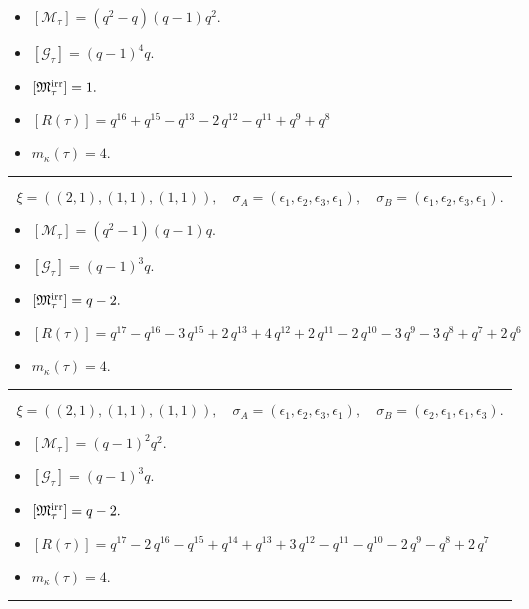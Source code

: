 \documentclass[10pt,a4paper]{amsart}
\begin{document}
\begin{itemize}
 \item $[\mathcal{M}_{\tau}] = {\left(q^{2} - q\right)} {\left(q - 1\right)} q^{2} .$

 \item $[\mathcal{G}_{\tau}] = {\left(q - 1\right)}^{4} q .$

 \item $[{\frak M}_{\tau}^{\textrm{irr}}] = 1 .$

 \item $[R(\tau)] = q^{16} + q^{15} - q^{13} - 2 \, q^{12} - q^{11} + q^{9} + q^{8} $

 \item $m_{\kappa}(\tau) = 4 .$

 \end{itemize}
\noindent\rule{8cm}{0.4pt}

$$\xi = ({(2, 1)}, {(1, 1)}, {(1, 1)}),\quad \sigma_A = ({{\epsilon_1, \epsilon_2}}, {{\epsilon_3}}, {{\epsilon_1}}),\quad \sigma_B = ({{\epsilon_1, \epsilon_2}}, {{\epsilon_3}}, {{\epsilon_1}}).$$

\begin{itemize}
 \item $[\mathcal{M}_{\tau}] = {\left(q^{2} - 1\right)} {\left(q - 1\right)} q .$

 \item $[\mathcal{G}_{\tau}] = {\left(q - 1\right)}^{3} q .$

 \item $[{\frak M}_{\tau}^{\textrm{irr}}] = q - 2 .$

 \item $[R(\tau)] = q^{17} - q^{16} - 3 \, q^{15} + 2 \, q^{13} + 4 \, q^{12} + 2 \, q^{11} - 2 \, q^{10} - 3 \, q^{9} - 3 \, q^{8} + q^{7} + 2 \, q^{6} $

 \item $m_{\kappa}(\tau) = 4 .$

 \end{itemize}
\noindent\rule{8cm}{0.4pt}

$$\xi = ({(2, 1)}, {(1, 1)}, {(1, 1)}),\quad \sigma_A = ({{\epsilon_1, \epsilon_2}}, {{\epsilon_3}}, {{\epsilon_1}}),\quad \sigma_B = ({{\epsilon_2, \epsilon_1}}, {{\epsilon_1}}, {{\epsilon_3}}).$$

\begin{itemize}
 \item $[\mathcal{M}_{\tau}] = {\left(q - 1\right)}^{2} q^{2} .$

 \item $[\mathcal{G}_{\tau}] = {\left(q - 1\right)}^{3} q .$

 \item $[{\frak M}_{\tau}^{\textrm{irr}}] = q - 2 .$

 \item $[R(\tau)] = q^{17} - 2 \, q^{16} - q^{15} + q^{14} + q^{13} + 3 \, q^{12} - q^{11} - q^{10} - 2 \, q^{9} - q^{8} + 2 \, q^{7} $

 \item $m_{\kappa}(\tau) = 4 .$

 \end{itemize}
\noindent\rule{8cm}{0.4pt}
\end{document}
